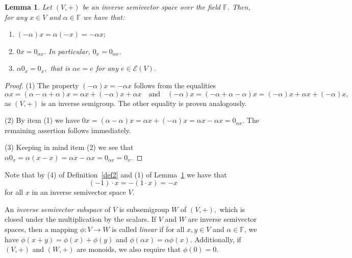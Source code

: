 \documentclass{amsart}
\newcommand{\E}{\mathcal{E}}
\newcommand{\F}{\mathbb{F}}
\newcommand{\0}{{\vartheta}}
\newtheorem{lem}[thm]{Lemma}
\theoremstyle{definition}
\theoremstyle{remark}
\numberwithin{equation}{section}
\newtheorem*{Theorem A}{\textbf{Theorem A}}
\newtheorem*{Corollary E}{\textbf{Corollary E}}
\newtheorem*{Corollary F}{\textbf{Corollary F}}
\newtheorem*{Theorem B}{\textbf{Theorem B}}
\newtheorem*{Theorem C}{\textbf{Theorem C}}
\newtheorem*{Theorem D}{\textbf{Theorem B}}
\newtheorem*{p a}{\textbf{Proof of  Theorem A}}
\newtheorem*{p b}{\textbf{Proof of Theorem B}}
\newtheorem*{p c}{\textbf{Proof of  Theorem C}}
\newtheorem*{p d}{\textbf{Proof of  Theorem D}}
\begin{document}

\begin{lem}\label{p1f}
Let $(V,+)$ be an inverse semivector space over the field $\mathbb{F}$. Then, for any $x\in V$ and $\alpha \in \mathbb F$ we have that:
\begin{enumerate}
\item $(-\alpha )x=\alpha (-x)=-\alpha x;$ 
\item $0x=0_{\alpha x}.$ In particular, $0_x=0_{\alpha x}.$ 
\item $\alpha 0_x = 0_x,$ that is $\alpha e=e$ for any $e\in \E(V).$
\end{enumerate}
    \end{lem}
\begin{proof}
  (1) The  property $(-\alpha) x=-\alpha x$ follows from the equalities $$\alpha x=(\alpha -\alpha+\alpha)x=\alpha x+(-\alpha)x+ \alpha x \quad \mbox{and} \quad (-\alpha) x=(-\alpha +\alpha-\alpha)x=(-\alpha) x+\alpha x+ (-\alpha) x,$$ as $(V,+)$ is an inverse semigroup. The other equality is proven analogously.

(2) By item (1) we have $0x=(\alpha-\alpha)x=\alpha x+(-\alpha)x=\alpha x-\alpha x=0_{\alpha x}.$ The remaining assertion follows immediately.

(3) Keeping in mind item (2) we see that $\alpha 0_x = \alpha (x-x) = \alpha x - \alpha x = 0_{\alpha x} = 0_{x}.$
\end{proof}

 Note that by (4) of Definition~\ref{def2} and (1) of Lemma~\ref{p1f} we have that 
$$(-1)\cdot x   = -(1 \cdot x) = -x$$ 
for all $x$ in an inverse semivector space $V.$ 

An {\em inverse semivector subspace} of $V$ is subsemigroup   $W$ of $(V,+),$  which is closed under the multiplication by the scalars. If $V$ and $W$ are inverse semivector spaces, then a mapping
 $\phi: V\to W$ is called {\em linear}  if for all $x,y\in V$ and $\alpha\in \F$, we have $\phi(x+y)=\phi(x)+\phi(y)$ and $\phi(\alpha x)=\alpha\phi(x)$. Additionally, if $(V,+)$ and $(W,+)$ are monoids, we also require that $\phi(0)=0$. 
\end{document}

